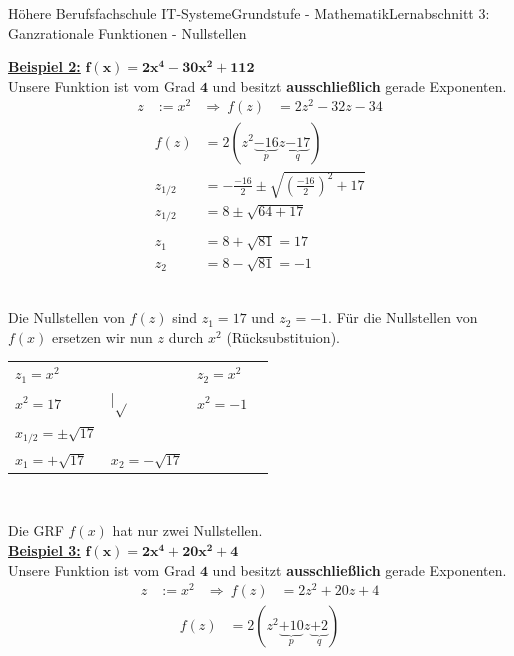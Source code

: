 \documentclass[11pt,twocolumn,oneside,openany,headings=optiontotoc,11pt,numbers=noenddot]{article}
\begin{document}
\begin{worksheet}{Höhere Berufsfachschule IT-Systeme}{Grundstufe - Mathematik}{Lernabschnitt 3: Ganzrationale Funktionen - Nullstellen}
		\par\noindent
		\textbf{\underline{Beispiel 2:}} \(\mathbf{f(x) = 2x^4 -30x^2 +112}\)\\
		Unsere Funktion ist vom Grad \(\mathbf{4}\) und besitzt \textbf{ausschließlich} gerade Exponenten.
		\begin{align*}
			z & := x^2 & \Rightarrow\ f(z) & = 2z^2 -32z - 34
		\end{align*}
		\begin{align*}			
			f(z) & = 2(z^2 \underbrace{-16}_{p}z \underbrace{-17}_{q})\\
			z_{1/2} & = -\frac{-16}{2} \pm \sqrt{\left(\frac{-16}{2}\right)^2 + 17}\\
			z_{1/2} & = 8 \pm \sqrt{64 + 17}\\
			\\
			z_1 & = 8 + \sqrt{81} = 17\\
			z_2 & = 8 - \sqrt{81} = -1
		\end{align*}\\
		\par\noindent
		Die Nullstellen von \(f(z)\) sind \(z_1=17\) und \(z_2=-1\). Für die Nullstellen von \(f(x)\) ersetzen wir nun \(z\) durch \(x^2\) (Rücksubstituion).\\
		\par\noindent
		\begin{tabularx}{0.48\textwidth}{Ml|Ml}
			\(z_1 = x^2\) & & \(z_2 = x^2\) &\\
			\(x^2 = 17\) & |\(\sqrt{}\) & \(x^2 = -1\) & \lightning\\
			\(x_{1/2} = \pm \sqrt{17}\) & & \\
			\colorbox{green!10}{\(x_1 = +\sqrt{17}\)} & \colorbox{green!10}{\(x_2 = -\sqrt{17}\)} & \\
		\end{tabularx}\\		
		\par\noindent
		Die GRF \(f(x)\) hat nur zwei Nullstellen.\\
		\textbf{\underline{Beispiel 3:}} \(\mathbf{f(x) = 2x^4 + 20x^2 + 4}\)\\
		Unsere Funktion ist vom Grad \(\mathbf{4}\) und besitzt \textbf{ausschließlich} gerade Exponenten.
		\begin{align*}
		z & := x^2 & \Rightarrow\ f(z) & = 2z^2 + 20z + 4
		\end{align*}
		\begin{align*}			
		f(z) & = 2(z^2 \underbrace{+10}_{p}z \underbrace{+2}_{q})\\

\end{align*}
\end{worksheet}
\end{document}
